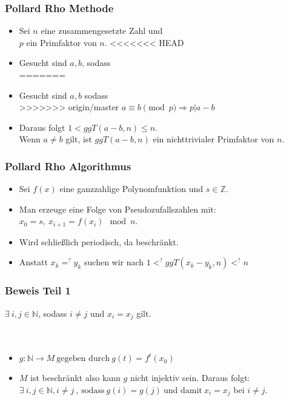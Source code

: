 \documentclass[mathserif, compress, german]{beamer}
\begin{document}
\begin{frame}
  \frametitle{Pollard Rho Methode}
  \begin{itemize}
    \item<2-> Sei $n$ eine zusammengesetzte Zahl und \\$p$ ein Primfaktor von $n$.
      \vspace{3mm}
<<<<<<< HEAD
    \item<3-> Gesucht sind $a, b$, sodass\\
=======
    \item<3-> Gesucht sind $a, b$ sodass\\
>>>>>>> origin/master
              $a \equiv b \pmod p \Rightarrow p|a-b$ \\
      \vspace{3mm}
    \item<4-> Daraus folgt $1<ggT(a-b,n) \leq  n$. \\Wenn $a\not = b$ gilt, ist $ggT(a-b,n)$ ein nichttrivialer Primfaktor von $n$.
  \end{itemize}
\end{frame}

\begin{frame}
  \frametitle{Pollard Rho Algorithmus}
  \begin{itemize}
    \item<2-> Sei $f(x)$ eine ganzzahlige Polynomfunktion und $s \in \mathbb{Z}$.
     \vspace{3mm}
    \item<3-> Man erzeuge eine Folge von Pseudozufallszahlen mit:\\ $x_0= s, \ x_{i+1}=f(x_i)\mod n$.
   \vspace{3mm}
    \item<4-> Wird schlie\ss{}lich periodisch, da beschr\"ankt.
    \vspace{3mm}
    \item<5-> Anstatt $x_k=^?y_k$ suchen wir nach $1 <^? ggT(x_k - y_k, n)<^? n$
  \end{itemize}
\end{frame}

\begin{frame}
  \frametitle{Beweis Teil 1}
$\exists \ i,j \in \mathbb{N}$, sodass $i \not= j$ und $x_i = x_j$ gilt.\\
\ \\
\ \\
  \begin{itemize}
    \item<2->  $g:\mathbb{N} \rightarrow M \ \text{gegeben durch} \ g(t)=f^t(x_0)$
      \vspace{3mm}
    \item<3-> $M$ ist beschr\"ankt also kann $g$ nicht injektiv sein. Daraus folgt:\\
	      $\exists \ i,j \in \mathbb{N}, i\not=j \ \text{, sodass} \ g(i)=g(j) \ \text{und damit} \ x_i=x_j$ bei $i\not=j$.
  \end{itemize}
\end{frame}
\end{document}
